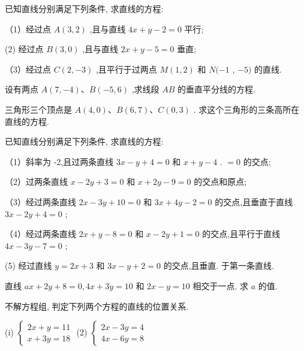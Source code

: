 \documentclass[lang=cn,newtx,10pt,scheme=chinese]{elegantbook}
\begin{document}
\begin{problemset}[习 题 三]

\item 已知直线分别满足下列条件, 求直线的方程:

（1）经过点 \(A\left( {3,2}\right)\) ,且与直线 \({4x} + y - 2 = 0\) 平行;

(2) 经过点 \(B\left( {3,0}\right)\) ,且与直线 \({2x} + y - 5 = 0\) 垂直;

（3）经过点 \(C\left( {2, - 3}\right)\) ,且平行于过两点 \(M\left( {1,2}\right)\) 和 \(N( - 1\) , \(- 5)\) 的直线.

\item 设有两点 \(A\left( {7, - 4}\right) \text{、}B\left( {-5,6}\right)\) ,求线段 \({AB}\) 的垂直平分线的方程.

\item 三角形三个顶点是 \(A\left( {4,0}\right) \text{、}B\left( {6,7}\right) \text{、}C\left( {0,3}\right)\) . 求这个三角形的三条高所在直线的方程.

\item 已知直线分别满足下列条件, 求直线的方程:

（1）斜率为 -2,且过两条直线 \({3x} - y + 4 = 0\) 和 \(x + y - 4\) . \(= 0\) 的交点;

（2）过两条直线 \(x - {2y} + 3 = 0\) 和 \(x + {2y} - 9 = 0\) 的交点和原点;

（3）经过两条直线 \({2x} - {3y} + {10} = 0\) 和 \({3x} + {4y} - 2 = 0\) 的交点,且垂直于直线 \({3x} - {2y} + 4 = 0\) ;

（4）经过两条直线 \({2x} + y - 8 = 0\) 和 \(x - {2y} + 1 = 0\) 的交点,且平行于直线 \({4x} - {3y} - 7 = 0\) ;

(5) 经过直线 \(y = {2x} + 3\) 和 \({3x} - y + 2 = 0\) 的交点,且垂直. 于第一条直线.

\item 直线 \({ax} + {2y} + 8 = 0,{4x} + 3\dot{y} = {10}\) 和 \({2x} - y = {10}\) 相交于一点. 求 \(a\) 的值.

\item 不解方程组, 判定下列两个方程的直线的位置关系.

(i) \(\left\{ \begin{array}{l} {2x} + y = {11} \\ x + {3y} = {18} \end{array}\right.\) (2) \(\left\{ \begin{array}{l} {2x} - {3y} = 4 \\ {4x} - {6y} = 8 \end{array}\right.\)


\end{problemset}
\end{document}
